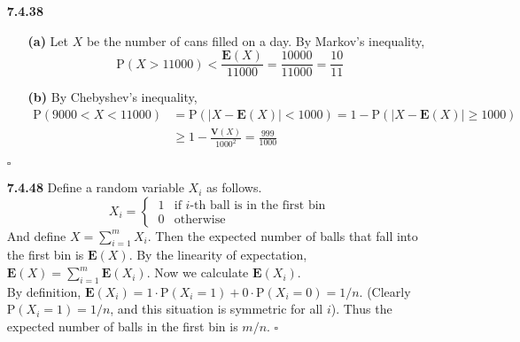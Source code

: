 \documentclass{article}
\newcommand*{\qed}{\hfill\ensuremath{\square}}%
\newcommand*{\pr}{\mathrm{P}}%
\newcommand*{\ex}{\mathrm{\mathbf{E}}}%
\newcommand*{\var}{\mathrm{\mathbf{V}}}%
\begin{document}
\begin{itemize}
\item[\large \textbf{7.4.38}]
	\begin{itemize}
		\item[\textbf{(a)}] Let $X$ be the number of cans filled on a day. By Markov's inequality, $$\pr(X > 11000) < \frac{\ex(X)}{11000} = \frac{10000}{11000} = \frac{10}{11}$$
		\item[\textbf{(b)}] By Chebyshev's inequality, $$
		\begin{aligned}
		\pr(9000<X<11000) &= \pr(\left|X - \ex(X)\right| < 1000) = 1 - \pr(\left|X - \ex(X)\right| \geq 1000) \\
		&\geq 1 - \frac{\var(X)}{1000^2} = \frac{999}{1000}
		\end{aligned}$$
	\end{itemize} \qed
\item[\large \textbf{7.4.48}] Define a random variable $X_i$ as follows.
$$X_i = \begin{cases}
\: 1 & \text{if } i\text{-th ball is in the first bin}\\
\: 0 & \text{otherwise}
		\end{cases}$$
And define $X = \sum_{i=1}^m X_i$. Then the expected number of balls that fall into the first bin is $\ex(X)$. By the linearity of expectation, $\ex(X)=\sum_{i=1}^m \ex(X_i)$. Now we calculate $\ex(X_i)$. \\
By definition, $\ex(X_i) = 1 \cdot \pr(X_i = 1) + 0 \cdot \pr(X_i = 0) = 1/n$. (Clearly $\pr(X_i = 1) = 1/n$, and this situation is symmetric for all $i$). Thus the expected number of balls in the first bin is $m/n$. \qed





\end{itemize}
\end{document}
